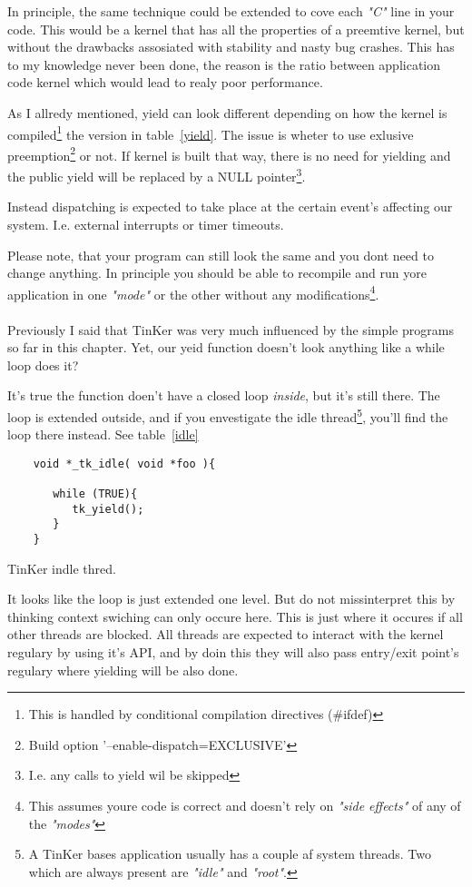 	In principle, the same technique could be extended to cove each \textit{"C"} line in your code. This would be a kernel that has all the properties of a preemtive kernel, but without the drawbacks assosiated with stability and nasty bug crashes. This has to my knowledge never been done, the reason is the ratio between application code kernel which would lead to realy poor performance.

	As I allredy mentioned, yield can look different depending on how the kernel is compiled\footnote{This is handled by conditional compilation directives (\#ifdef)}  the version in table~\ref{yield}. The issue is wheter to use exlusive preemption\footnote{Build option '--enable-dispatch=EXCLUSIVE'} or not. If kernel is built that way, there is no need for yielding and the public yield will be replaced by a NULL pointer\footnote{I.e. any calls to yield wil be skipped}.

	Instead dispatching is expected to take place at the certain event's affecting our system. I.e. external interrupts or timer timeouts. 

	Please note, that your program can still look the same and you dont need to change anything. In principle you should be able to recompile and run yore application in one \textit{"mode"} or the other without any modifications\footnote{This assumes youre code is correct and doesn't rely on \textit{"side effects"} of any of the \textit{"modes"}}.
\\\\
	Previously I said that TinKer was very much influenced by the simple programs so far in this chapter. Yet, our yeid function doesn't look anything like a while loop does it? 

	It's true the function doen't have a closed loop \textit{inside}, but it's still there. The loop is extended outside, and if you envestigate the idle thread\footnote{A TinKer bases application usually has a couple af system threads. Two which are always present are \textit{"idle"} and \textit{"root"}.}, you'll find the loop there instead. See table~\ref{idle}
	\begin{table}[!hbp]
	\begin{verbatim}
	void *_tk_idle( void *foo ){
 
	   while (TRUE){
	      tk_yield();
	   }
	}
	\end{verbatim}
	\caption{TinKer indle thred.\label{idle}}
	\end{table}
	
	It looks like the loop is just extended one level. But do not missinterpret this by thinking context swiching can only occure here. This is just where it occures if all other threads are blocked. All threads are expected to interact with the kernel regulary by using it's API, and by doin this they will also pass entry/exit point's regulary where yielding will be also done.

